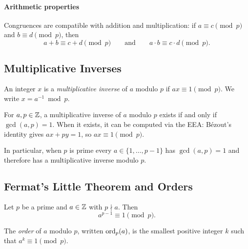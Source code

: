 \documentclass[11pt]{article}
\begin{document}
\paragraph{Arithmetic properties}  Congruences are compatible with
addition and multiplication: if $a \equiv c \pmod{p}$ and
$b \equiv d \pmod{p}$, then
\[
  a + b \equiv c + d \pmod{p}
  \qquad \text{and} \qquad
  a \cdot b \equiv c \cdot d \pmod{p}.
\]

\subsection{Multiplicative Inverses}

\begin{definition}
  An integer $x$ is a \emph{multiplicative inverse} of $a$ modulo $p$
  if $ax \equiv 1 \pmod{p}$.  We write $x = a^{-1} \bmod p$.
\end{definition}

\begin{fact}
  For $a, p \in \mathbb{Z}$, a multiplicative inverse of $a$ modulo $p$ exists
  if and only if $\gcd(a, p) = 1$.  When it exists, it can be computed
  via the EEA: B\'ezout's identity gives $ax + py = 1$, so
  $ax \equiv 1 \pmod{p}$.
\end{fact}

In particular, when $p$ is prime every $a \in \{1, \ldots, p-1\}$ has
$\gcd(a, p) = 1$ and therefore has a multiplicative inverse modulo $p$.

\subsection{Fermat's Little Theorem and Orders}

\begin{theorem}
  Let $p$ be a prime and $a \in \mathbb{Z}$ with $p \nmid a$.  Then
  \[
    a^{p-1} \equiv 1 \pmod{p}.
  \]
\end{theorem}

\begin{definition}
  The \emph{order} of $a$ modulo $p$, written $\operatorname{ord}_p(a)$, is the
  smallest positive integer $k$ such that $a^k \equiv 1 \pmod{p}$.
\end{definition}
\end{document}
